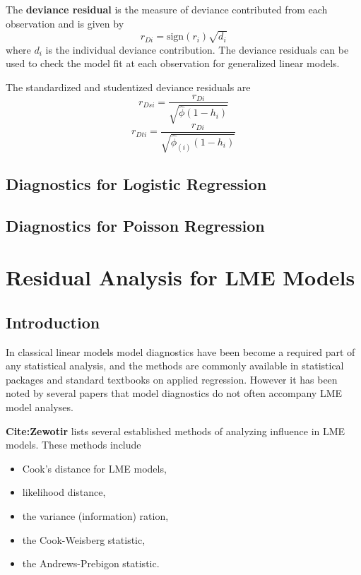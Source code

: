 \documentclass[12pt, a4paper]{article}
\theoremstyle{plain}
\theoremstyle{definition}
\theoremstyle{remark}
\begin{document}
The \textbf{deviance residual} is the measure of deviance contributed from each observation and is given by
\[r_{Di} = \textrm{sign}( r_{i})
 \sqrt{ d_{i}}\]
where $d_i$ is the individual deviance contribution.
The deviance residuals can be used to check the model fit at each observation for generalized linear models. 


The standardized and studentized deviance residuals are
\[
r_{Dsi} = \frac{r_{Di}}{\sqrt{\hat{ \phi} (1- h_{i})} }\]
\[r_{Dti} = \frac{r_{Di}}{\sqrt{ \hat{ \phi}_{(i)}
 (1- h_{i})}}\]
 
\newpage
 
\subsection{Diagnostics for Logistic Regression}

\subsection{Diagnostics for Poisson Regression}
\newpage
\section{Residual Analysis for LME Models}
\subsection{Introduction}%
In classical linear models model diagnostics have been become a required part of any statistical analysis, and the methods are commonly available in statistical packages and standard textbooks on applied regression. However it has been noted by several papers that model diagnostics do not often accompany LME model analyses.

\textbf{Cite:Zewotir} lists several established methods of analyzing influence in LME models. These methods include \begin{itemize}
\item Cook's distance for LME models,
\item {} likelihood distance,
\item the variance (information) ration,
\item the  Cook-Weisberg statistic,
\item the  Andrews-Prebigon statistic.
\end{itemize}
\end{document}
